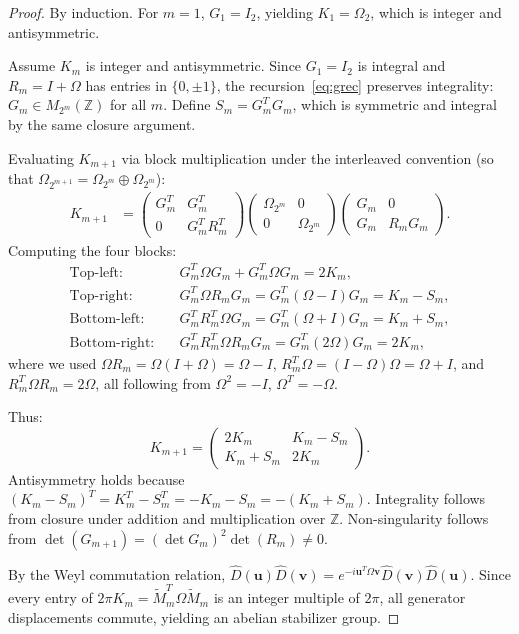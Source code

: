 \documentclass[aps,prl,twocolumn,superscriptaddress]{revtex4-2}
\newcommand{\symp}{\Omega}
\newcommand{\bvec}[1]{\boldsymbol{#1}}
\begin{document}
\begin{proof}
By induction. For $m=1$, $G_1 = I_2$, yielding $K_1 = \symp_2$, which is integer and antisymmetric.

Assume $K_m$ is integer and antisymmetric. Since $G_1 = I_2$ is integral and $R_m = I + \symp$ has entries in $\{0, \pm 1\}$, the recursion~\eqref{eq:grec} preserves integrality: $G_m \in M_{2^m}(\mathbb{Z})$ for all $m$. Define $S_m = G_m^T G_m$, which is symmetric and integral by the same closure argument.

Evaluating $K_{m+1}$ via block multiplication under the interleaved convention (so that $\symp_{2^{m+1}} = \symp_{2^m} \oplus \symp_{2^m}$):
\begin{align}
K_{m+1} &= \begin{pmatrix} G_m^T & G_m^T \\ 0 & G_m^T R_m^T \end{pmatrix}
           \begin{pmatrix} \symp_{2^m} & 0 \\ 0 & \symp_{2^m} \end{pmatrix}
           \begin{pmatrix} G_m & 0 \\ G_m & R_m G_m \end{pmatrix}.
\end{align}
Computing the four blocks:
\begin{align}
\text{Top-left:}&\quad G_m^T \symp G_m + G_m^T \symp G_m = 2K_m, \nonumber\\
\text{Top-right:}&\quad G_m^T \symp R_m G_m = G_m^T(\symp - I)G_m = K_m - S_m, \nonumber\\
\text{Bottom-left:}&\quad G_m^T R_m^T \symp G_m = G_m^T(\symp + I)G_m = K_m + S_m, \nonumber\\
\text{Bottom-right:}&\quad G_m^T R_m^T \symp R_m G_m = G_m^T (2\symp) G_m = 2K_m, \nonumber
\end{align}
where we used $\symp R_m = \symp(I+\symp) = \symp - I$, $R_m^T \symp = (I-\symp)\symp = \symp + I$, and $R_m^T \symp R_m = 2\symp$, all following from $\symp^2 = -I$, $\symp^T = -\symp$.

Thus:
\begin{equation}\label{eq:k-recursive}
K_{m+1} = \begin{pmatrix} 2K_m & K_m - S_m \\ K_m + S_m & 2K_m \end{pmatrix}.
\end{equation}
Antisymmetry holds because $(K_m - S_m)^T = K_m^T - S_m^T = -K_m - S_m = -(K_m + S_m)$. Integrality follows from closure under addition and multiplication over $\mathbb{Z}$. Non-singularity follows from $\det(G_{m+1}) = (\det G_m)^2 \det(R_m) \neq 0$.

By the Weyl commutation relation, $\hat{D}(\bvec{u})\hat{D}(\bvec{v}) = e^{-i \bvec{u}^T \symp \bvec{v}} \hat{D}(\bvec{v})\hat{D}(\bvec{u})$. Since every entry of $2\pi K_m = \tilde{M}_m^T \symp \tilde{M}_m$ is an integer multiple of $2\pi$, all generator displacements commute, yielding an abelian stabilizer group.
\end{proof}
\end{document}
